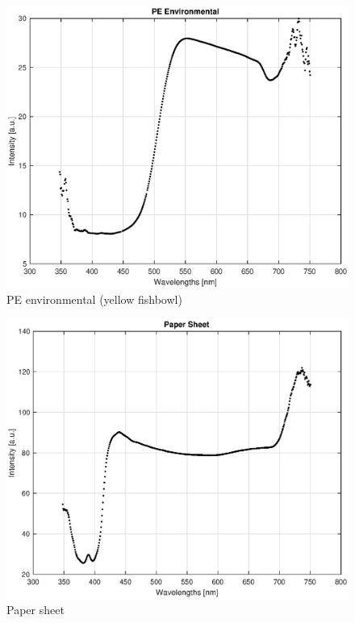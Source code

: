 \begin{appendices}
\begin{figure}
    \centering
    \includegraphics[width = 12cm]{Images/appendix/p-env_yellowbowl.eps}
    \caption{PE environmental (yellow fishbowl)}
    \label{fig:pe_env}
\end{figure}

\begin{figure}
    \centering
    \includegraphics[width = 12cm]{Images/appendix/papersheet.eps}
    \caption{Paper sheet}
    \label{fig:paper}
\end{figure}


\end{appendices}
